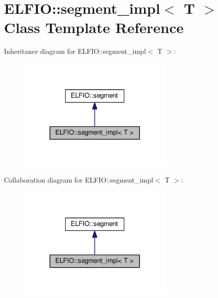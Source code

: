 \hypertarget{class_e_l_f_i_o_1_1segment__impl}{}\section{E\+L\+F\+IO\+:\+:segment\+\_\+impl$<$ T $>$ Class Template Reference}
\label{class_e_l_f_i_o_1_1segment__impl}


Inheritance diagram for E\+L\+F\+IO\+:\+:segment\+\_\+impl$<$ T $>$\+:\nopagebreak
\begin{figure}[H]
\begin{center}
\leavevmode
\includegraphics[width=216pt]{class_e_l_f_i_o_1_1segment__impl__inherit__graph}
\end{center}
\end{figure}


Collaboration diagram for E\+L\+F\+IO\+:\+:segment\+\_\+impl$<$ T $>$\+:\nopagebreak
\begin{figure}[H]
\begin{center}
\leavevmode
\includegraphics[width=216pt]{class_e_l_f_i_o_1_1segment__impl__coll__graph}
\end{center}
\end{figure}
